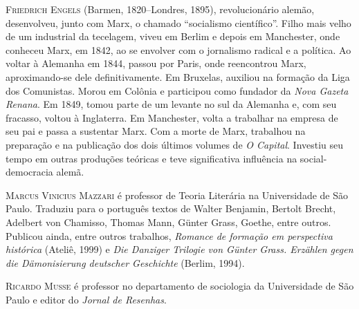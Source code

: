 {\noindent\textsc{Friedrich Engels} (Barmen, 1820--Londres, 1895), revolucionário alemão,
desenvolveu, junto com Marx, o chamado “socialismo científico”. Filho mais velho
de um industrial da tecelagem, viveu em Berlim e depois em Manchester, onde
conheceu Marx, em 1842, ao se envolver com o jornalismo radical e a política.
Ao voltar à Alemanha em 1844, passou por Paris, onde reencontrou Marx,
aproximando-se dele definitivamente. Em Bruxelas, auxiliou na formação da Liga
dos Comunistas. Morou em Colônia e participou como fundador da \textit{Nova
Gazeta Renana}. Em 1849, tomou parte de um levante no sul da Alemanha e, com seu
fracasso, voltou à Inglaterra. Em Manchester, volta a trabalhar na empresa de
seu pai e passa a sustentar Marx. 
Com a morte de Marx, trabalhou na preparação e na publicação dos dois últimos
volumes de \textit{O Capital}. Investiu seu tempo em outras produções teóricas e
teve significativa influência na social-democracia alemã.   %

\noindent\textsc{Marcus Vinicius Mazzari} é professor de Teoria Literária na Universidade
de São Paulo. Traduziu para o português textos de Walter Benjamin, Bertolt
Brecht, Adelbert von Chamisso, Thomas Mann, Günter Grass, Goethe, entre outros.
Publicou ainda, entre outros trabalhos, \textit{Romance de formação em perspectiva histórica}
(Ateliê, 1999) e \textit{Die Danziger Trilogie von Günter Grass. Erzählen gegen
die Dämonisierung deutscher Geschichte} (Berlim, 1994).  %

\noindent\textsc{Ricardo Musse} é professor no departamento de sociologia da Universidade
de São Paulo e editor do \textit{Jornal de Resenhas}.  %

}


